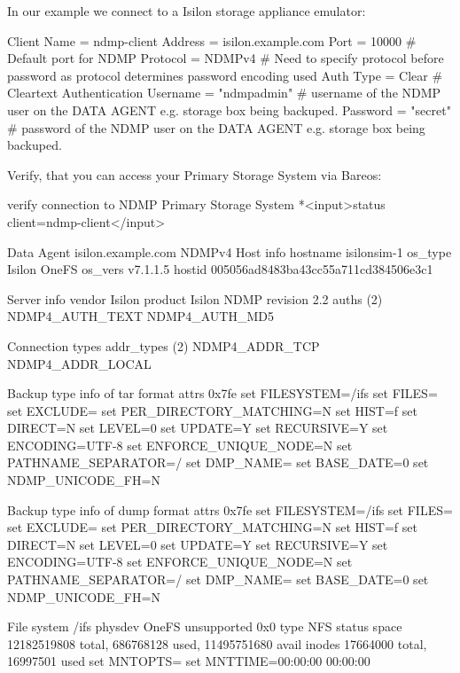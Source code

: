 In our example we connect to a Isilon storage appliance emulator:
\begin{bconfig}{}
Client {
  Name = ndmp-client
  Address = isilon.example.com
  Port = 10000            # Default port for NDMP
  Protocol = NDMPv4       # Need to specify protocol before password as protocol determines password encoding used
  Auth Type = Clear       # Cleartext Authentication
  Username = "ndmpadmin"  # username of the NDMP user on the DATA AGENT e.g. storage box being backuped.
  Password = "secret"     # password of the NDMP user on the DATA AGENT e.g. storage box being backuped.
}
\end{bconfig}

Verify, that you can access your Primary Storage System via Bareos:

\begin{bconsole}{verify connection to NDMP Primary Storage System}
*<input>status client=ndmp-client</input>

Data Agent isilon.example.com NDMPv4
  Host info
    hostname   isilonsim-1
    os_type    Isilon OneFS
    os_vers    v7.1.1.5
    hostid     005056ad8483ba43cc55a711cd384506e3c1

  Server info
    vendor     Isilon
    product    Isilon NDMP
    revision   2.2
    auths      (2) NDMP4_AUTH_TEXT NDMP4_AUTH_MD5

  Connection types
    addr_types (2) NDMP4_ADDR_TCP NDMP4_ADDR_LOCAL

  Backup type info of tar format
    attrs      0x7fe
    set        FILESYSTEM=/ifs
    set        FILES=
    set        EXCLUDE=
    set        PER_DIRECTORY_MATCHING=N
    set        HIST=f
    set        DIRECT=N
    set        LEVEL=0
    set        UPDATE=Y
    set        RECURSIVE=Y
    set        ENCODING=UTF-8
    set        ENFORCE_UNIQUE_NODE=N
    set        PATHNAME_SEPARATOR=/
    set        DMP_NAME=
    set        BASE_DATE=0
    set        NDMP_UNICODE_FH=N

  Backup type info of dump format
    attrs      0x7fe
    set        FILESYSTEM=/ifs
    set        FILES=
    set        EXCLUDE=
    set        PER_DIRECTORY_MATCHING=N
    set        HIST=f
    set        DIRECT=N
    set        LEVEL=0
    set        UPDATE=Y
    set        RECURSIVE=Y
    set        ENCODING=UTF-8
    set        ENFORCE_UNIQUE_NODE=N
    set        PATHNAME_SEPARATOR=/
    set        DMP_NAME=
    set        BASE_DATE=0
    set        NDMP_UNICODE_FH=N

  File system /ifs
    physdev    OneFS
    unsupported 0x0
    type       NFS
    status
    space      12182519808 total, 686768128 used, 11495751680 avail
    inodes     17664000 total, 16997501 used
    set        MNTOPTS=
    set        MNTTIME=00:00:00 00:00:00
\end{bconsole}

